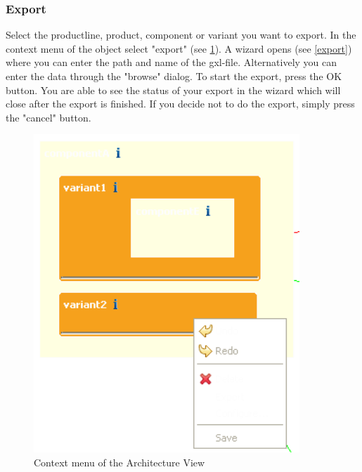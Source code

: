 \subsubsection{Export}

Select the productline, product, component or variant you want to export. In the
context menu of the object select "export" (see \ref{archcontext}). A wizard opens (see \ref{export}) where you can enter
the path and name of the gxl-file. Alternatively you can enter 
the data through the "browse" dialog. To start the export, press the OK button.
You are able to see the status of your export in the wizard which will close after
the export is finished. If you decide not to do the export, simply press the 
"cancel" button.

\begin{figure}[h!]
\begin{center}
\includegraphics[width=10cm]{architecturekontext.png}
   \caption{Context menu of the Architecture View}
\label{archcontext}
\end{center}
\end{figure}\par

